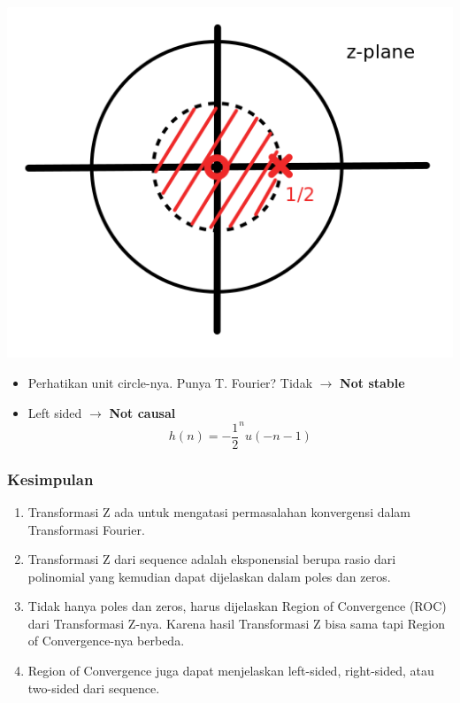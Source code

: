 \documentclass[pdflatex,compress,mathserif]{beamer}
\begin{document}
\begin{frame}
	\begin{multicols}{2}
		\begin{center}
			\includegraphics[width=\linewidth]{img/img05}
		\end{center}
		\columnbreak
		\begin{itemize}
			\item Perhatikan unit circle-nya. Punya T. Fourier? Tidak $\rightarrow$ \textbf{Not stable}
			\item Left sided $\rightarrow$ \textbf{Not causal}
			\[ h(n) = -\frac{1}{2}^n u(-n-1) \]
		\end{itemize}
	\end{multicols}
\end{frame}

\begin{frame}
	\frametitle{Kesimpulan}
	\begin{enumerate}
		\item Transformasi Z ada untuk mengatasi permasalahan konvergensi dalam Transformasi Fourier.
		\item Transformasi Z dari sequence adalah eksponensial berupa rasio dari polinomial yang kemudian dapat dijelaskan dalam poles dan zeros.
		\item Tidak hanya poles dan zeros, harus dijelaskan Region of Convergence (ROC) dari Transformasi Z-nya. Karena hasil Transformasi Z bisa sama tapi Region of Convergence-nya berbeda.
		\item Region of Convergence juga dapat menjelaskan left-sided, right-sided, atau two-sided dari sequence.
	\end{enumerate}
\end{frame}
\end{document}
